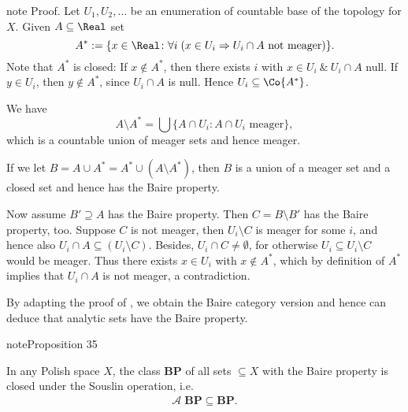 \documentclass[letterpaper,10pt,english]{jupyterBook}
\begin{document}
\begin{sphinxadmonition}{note}
\sphinxAtStartPar
Proof. Let  \(U_1, U_2, \ldots\) be an enumeration of countable base of the
topology for \(X\).
Given \(A \subseteq \Real\) set
\begin{equation*}
	A^*:= \{x \in \Real \colon \forall i \; ( x \in U_i \Rightarrow U_i \cap A \text{ not meager)}\}.
\end{equation*}
\sphinxAtStartPar
Note that \(A^*\) is closed: If \(x \not \in A^*\), then there exists \(i\) with \(x \in U_i \: \& \: U_i \cap A\) null. If \(y \in U_i\), then \(y \not \in A^*\), since \(U_i \cap A\) is null.
Hence \(U_i \subseteq \Co{A^*}\).

\sphinxAtStartPar
We have
\begin{equation*}
A \setminus A^* = \bigcup \{A \cap U_i \colon A \cap U_i \text{ meager}\},
\end{equation*}
\sphinxAtStartPar
which is a countable union of meager sets and hence meager.

\sphinxAtStartPar
If we let \(B = A \cup A^* = A^* \cup (A \setminus A^*)\), then \(B\) is a
union of a meager set and a closed set and hence has the Baire
property.

\sphinxAtStartPar
Now assume \(B' \supseteq A\) has the Baire property. Then \(C= B
\setminus B'\) has the Baire property, too. Suppose \(C\) is not meager,
then \(U_i \setminus C\) is meager for some \(i\), and hence also \(U_i
\cap A \subseteq (U_i \setminus C)\). Besides, \(U_i \cap C \neq
\emptyset\), for otherwise \(U_i \subseteq U_i \setminus C\) would be
meager. Thus there exists \(x \in U_i\) with \(x \not\in A^*\), which by
definition of \(A^*\) implies that \(U_i \cap A\) is not meager, a contradiction.
\end{sphinxadmonition}

\sphinxAtStartPar
By adapting the proof of {\hyperref[\detokenize{regularityAnalytic:prop-Souslin-Lebesgue}]{}}, we
obtain the Baire category version and hence can deduce that analytic sets
have the Baire property.
\label{regularityAnalytic:prop-Souslin-Baire}
\begin{sphinxadmonition}{note}{Proposition 35}



\sphinxAtStartPar
In any Polish space \(X\), the class \(\mathbf{BP}\) of all sets \(\subseteq X\)
with the Baire property is closed under the Souslin operation, i.e.
\begin{equation*}
\begin{split}
    \mathcal{A} \; \mathbf{BP} \subseteq  \mathbf{BP}.
\end{split}
\end{equation*}\end{sphinxadmonition}
\end{document}
